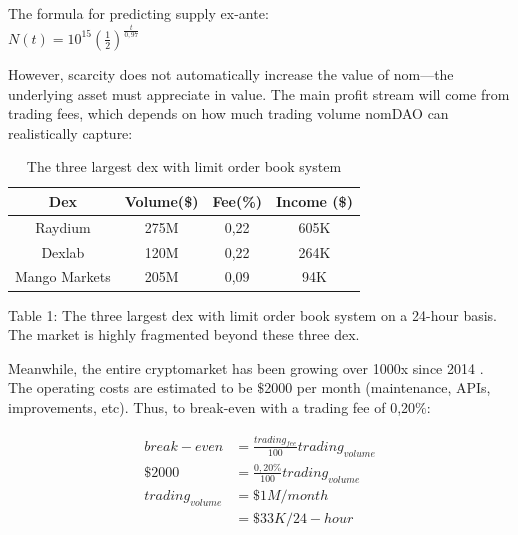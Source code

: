\documentclass[12pt]{article}
\begin{document}
The formula for predicting supply ex-ante:\\

$N(t)=10^{15}(\frac{1}{2})^\frac{t}{0,97}$


However, scarcity does not automatically increase the value of nom—the underlying asset must appreciate in value. The main profit stream will come from trading fees, which depends on how much trading volume nomDAO can realistically capture:

\begin{table}[ht]
\caption{The three largest dex with limit order book system}
\centering
\begin{tabular}{||c c c c||} 
 \hline
Dex & Volume(\$) &  Fee(\%) & Income (\$) \\ [0.5ex] 
 \hline\hline
 Raydium \cite{raydium} & 275M & 0,22 \cite{serum} & 605K \\ 
 \hline
 Dexlab \cite{dexlab} & 120M & 0,22 \cite{dexfee} & 264K \\
 \hline
Mango Markets \cite{mango} & 205M & 0,09 & 94K \\
 \hline
\end{tabular}
\label{Table 1}

Table 1: The three largest dex with limit order book system on a 24-hour basis. The market is highly fragmented beyond these three dex.
\end{table}

Meanwhile, the entire cryptomarket has been growing over 1000x since 2014 \cite{cryptovolume}. The operating costs are estimated to be $\$$2000 per month (maintenance, APIs, improvements, etc). Thus, to break-even with a trading fee of 0,20$\%$:

\begin{equation}\label{break-even}
\begin{split}
break-even &=\frac{trading_{fee}}{100} trading_{volume}\\
\$2000  &=\frac{0,20\%}{100} trading_{volume}\\
trading_{volume} &=\$1M/month\\
 &=\$33K/24-hour
\end{split}
\end{equation}
\\
\end{document}
